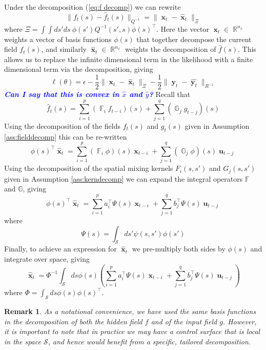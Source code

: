 \documentclass{IEEEtran}
\newcommand{\todo}[1]{\textsf{\emph{\textbf{\textcolor{blue}{#1}}}}}
\newcommand{\dist}[2]{\|#1\|_{#2}}
\DeclareMathOperator{\R}{\mathbb{R}}
\DeclareMathOperator{\F}{\mathbb{F}}
\DeclareMathOperator{\G}{\mathbb{G}}
\DeclareMathOperator{\xvec}{\mathbf{x}}
\DeclareMathOperator{\uvec}{\mathbf{u}}
\DeclareMathOperator{\yvec}{\mathbf{y}}
\newtheorem{remark}{Remark}
\begin{document}
Under the decomposition (\ref{eq:f decomp}) we can rewrite 
\begin{equation}
	\dist{f_t(s) - \hat{f}_t(s)}{Q^{-1}} = \dist{\xvec_t - \hat{\xvec}_t}{\Xi}
\end{equation}
where $\Xi = \int\int ds' ds ~ \phi(s')Q^{-1}(s',s)\phi(s)^\top$. Here the vector $\xvec_t \in \R^{n_x}$ weights a vector of basis functions $\phi(s)$ that together decompose the current field $f_t(s)$, and similarly $\hat{\xvec}_t \in \R^{n_x}$ weights the decomposition of $\hat{f}(s)$. This allows us to replace the infinite dimensional term in the likelihood with a finite dimensional term via the decomposition, giving
\begin{equation}
	\ell(\theta) =  \epsilon  - \frac{1}{2}\dist{\xvec_t - \hat{\xvec}_t}{\Xi} - \frac{1}{2}\dist{\yvec_t-\hat{\yvec_t}}{R^{-1}}
\end{equation}
\todo{Can I say that this is convex in $\hat{x}$ and $\hat{y}$?}
Recall that
\begin{equation}
	\hat{f}_t(s) = \sum_{i=1}^{p}( \F_i f_{t-i})(s) + \sum_{j=1}^{q}(\G_j g_{t-j})(s)
\end{equation}
Using the decomposition of the fields $f_t(s)$ and $g_t(s)$ given in Assumption \ref{ass:fielddecomp} this can be re-written
\begin{equation}
	\phi(s)^\top\hat{\xvec}_t = \sum_{i=1}^{p}(\F_i \phi)(s)\xvec_{t-i} + \sum_{j=1}^{q}(\G_j\phi)(s)\uvec_{t-j}
\end{equation}
Using the decomposition of the spatial mixing kernels $F_i(s,s')$ and $G_j(s,s')$ given in Assumption \ref{ass:kerndecomp} we can expand the integral operators $\mathbb{F}$ and $\mathbb{G}$, giving 
\begin{equation}
	\phi(s)^\top\hat{\xvec}_t =  \sum_{i=1}^{p} a_i^\top \Psi(s) \xvec_{t-i} + \sum_{j=1}^{q} b_j^\top \Psi(s) \uvec_{t-j}
\end{equation}
where 
\begin{equation}
	\Psi(s) = \int_\mathcal{S}ds' \psi(s,s') \phi(s')
\end{equation}
Finally, to achieve an expression for $\hat{\xvec}_t$ we pre-multiply both sides by $\phi(s)$ and integrate over space, giving
\begin{equation}
	\hat{\xvec}_t = \Phi^{-1} \int_\mathcal{S}ds \phi(s)\left(\sum_{i=1}^{p} a_i^\top \Psi(s) \xvec_{t-i} + \sum_{j=1}^{q} b_j^\top \Psi(s) \uvec_{t-j}\right)
\end{equation}
where $\Phi = \int_\mathcal{S}ds\phi(s)\phi(s)^\top$.
\begin{remark}
As a notational convenience, we have used the same basis functions in the decomposition of both the hidden field $f$ and of the input field $g$. However, it is important to note that in practice we may have a control surface that is local in the space $\mathcal{S}$, and hence would benefit from a specific, tailored decomposition. 
\end{remark}
\end{document}
